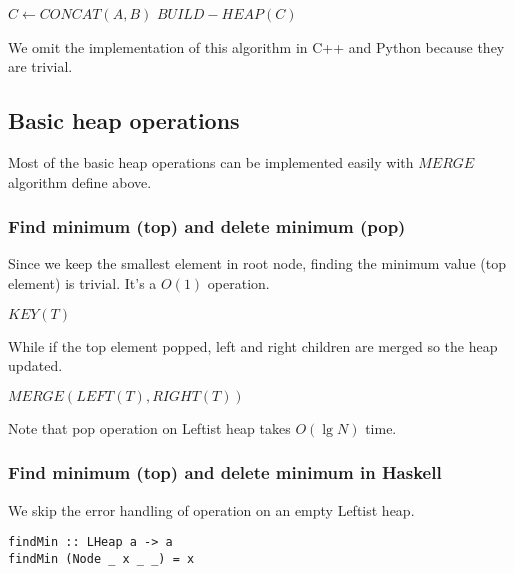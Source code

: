 \documentclass{article}
\begin{document}
\begin{algorithmic}[1]
  $C \gets CONCAT(A, B)$
  $BUILD-HEAP(C)$
\EndFunction
\end{algorithmic}

We omit the implementation of this algorithm in C++ and Python because
they are trivial.

\subsection{Basic heap operations}

Most of the basic heap operations can be implemented easily with $MERGE$
algorithm define above.

\subsubsection{Find minimum (top) and delete minimum (pop)}
Since we keep the smallest element in root node, finding the minimum
value (top element) is trivial. It's a $O(1)$ operation.

\begin{algorithmic}[1]
  \State \Return $KEY(T)$
\EndFunction
\end{algorithmic}

While if the top element popped, left and right children are merged
so the heap updated.

\begin{algorithmic}[1]
  \State \Return $MERGE(LEFT(T), RIGHT(T))$
\EndFunction
\end{algorithmic}

Note that pop operation on Leftist heap takes $O(\lg N)$ time.

\subsubsection*{Find minimum (top) and delete minimum in Haskell}

We skip the error handling of operation on an empty
Leftist heap.

\lstset{language=Haskell}
\begin{lstlisting}
findMin :: LHeap a -> a
findMin (Node _ x _ _) = x
\end{lstlisting}
\end{document}
